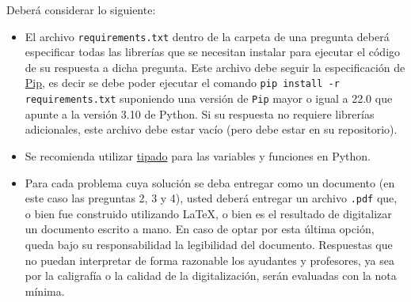 \bigskip


\bigskip

Deberá considerar lo siguiente:

\begin{itemize}

  \item El archivo \texttt{requirements.txt} dentro de la carpeta de una pregunta deberá especificar todas las librerías que se necesitan instalar para ejecutar el código de su respuesta a dicha pregunta. Este archivo debe seguir la especificación de \href{https://pypi.org/project/pip/}{Pip}, es decir se debe poder ejecutar el comando \texttt{pip install -r requirements.txt} suponiendo una versión de \texttt{Pip} mayor o igual a 22.0 que apunte a la versión 3.10 de Python. Si su respuesta no requiere librerías adicionales, este archivo debe estar vacío (pero debe estar en su repositorio).

  \item Se recomienda utilizar \href{https://docs.python.org/3.10/library/typing.html}{tipado} para las variables y funciones en Python.

  \item Para cada problema cuya solución se deba entregar como un documento (en este caso las preguntas 2, 3 y 4), usted deberá entregar un archivo \texttt{.pdf} que, o bien fue construido utilizando \LaTeX, o bien es el resultado de digitalizar un documento escrito a mano. En caso de optar por esta última opción, queda bajo su responsabilidad la legibilidad del documento. Respuestas que no puedan interpretar de forma razonable los ayudantes y profesores, ya sea por la caligrafía o la calidad de la digitalización, serán evaluadas con la nota mínima.

\end{itemize}
